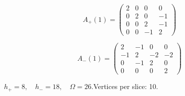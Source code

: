 \begin{minipage}{\linewidth}
\begin{minipage}[c]{0.495\linewidth}
\setlength{\abovedisplayshortskip}{4pt}\setlength{\belowdisplayshortskip}{4pt}
\setlength{\arraycolsep}{3pt}\renewcommand{\arraystretch}{1.08}
\[A_{+}(1)=\begin{pmatrix}2 & 0 & 0 & 0\\0 & 2 & 0 & -1\\0 & 0 & 2 & -1\\0 & 0 & -1 & 2\end{pmatrix}\]
\end{minipage}%
\begin{minipage}[c]{0.495\linewidth}\centering\fontsize{9.7}{12}\selectfont
\setlength{\abovedisplayskip}{4pt}\setlength{\belowdisplayskip}{4pt}
\setlength{\abovedisplayshortskip}{4pt}\setlength{\belowdisplayshortskip}{4pt}
\setlength{\arraycolsep}{3pt}\renewcommand{\arraystretch}{1.08}
\[A_{-}(1)=\begin{pmatrix}2 & -1 & 0 & 0\\-1 & 2 & -2 & -2\\0 & -1 & 2 & 0\\0 & 0 & 0 & 2\end{pmatrix}\]
\end{minipage}%
\par\smallskip\noindent\small $h_+=8,\quad h_-=18,\quad \Omega=26.$\quad Vertices per slice: 10.
\end{minipage}\par\vfill
\clearpage

